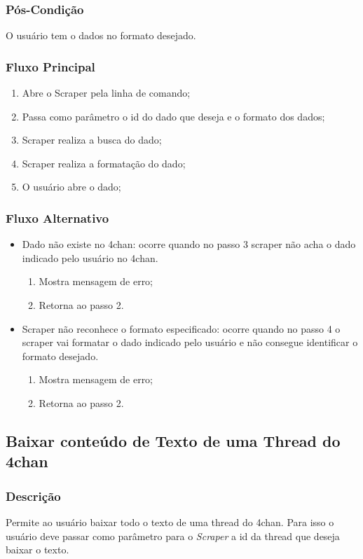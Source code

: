 \subsubsection{Pós-Condição}
O usuário tem o dados no formato desejado.
\subsubsection{Fluxo Principal}
\begin{enumerate}
    \item Abre o Scraper pela linha de comando;
    \item Passa como parâmetro o id do dado que deseja e o formato dos dados;
    \item Scraper realiza a busca do dado;
    \item Scraper realiza a formatação do dado;
    \item O usuário abre o dado;
\end{enumerate}
\subsubsection{Fluxo Alternativo}
\begin{itemize}
    \item Dado não existe no 4chan: ocorre quando no passo 3 scraper não acha o dado indicado pelo usuário no 4chan.
    \begin{enumerate}
        \item Mostra mensagem de erro;
        \item Retorna ao passo 2.
    \end{enumerate}
    \item Scraper não reconhece o formato especificado: ocorre quando no passo 4 o scraper vai formatar o dado indicado pelo usuário e não consegue identificar o formato desejado.
    \begin{enumerate}
        \item Mostra mensagem de erro;
        \item Retorna ao passo 2.
    \end{enumerate}
\end{itemize}


\subsection{Baixar conteúdo de Texto de uma Thread do 4chan}
\subsubsection{Descrição}
Permite ao usuário baixar todo o texto de uma thread do 4chan. Para isso o usuário deve passar como parâmetro para o \textit{Scraper} a id da thread que deseja baixar o texto.
